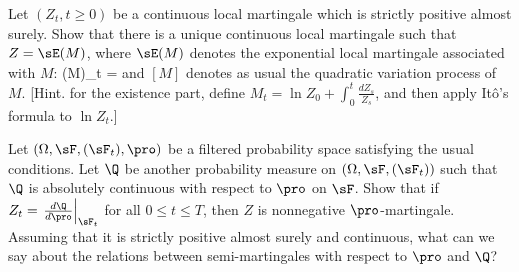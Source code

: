 \item [3.5] 
\ben
\item [(a)] Let $(Z_t, t \geq 0)$ be a continuous local martingale which is strictly positive almost surely. Show that there is a unique continuous local martingale such that $Z = \sE(M)$, where $\sE(M)$ denotes the exponential local martingale associated with $M$:
\be
\E(M)_t = \exp{}
\ee
and $[M]$ denotes as usual the quadratic variation process of $M$. [Hint. for the existence part, define $M_t = \ln Z_0 + \int^t_0 \frac{dZ_s}{Z_s}$, and then apply It\^o's formula to $\ln Z_t$.]

\item [(b)] Let $(\Omega,\sF, (\sF_t), \pro)$ be a filtered probability space satisfying the usual conditions. Let $\Q$ be another probability measure on $(\Omega,\sF, (\sF_t))$ such that $\Q$ is absolutely continuous with respect to $\pro$ on $\sF$. Show that if $Z_t = \left.\frac{d\Q}{d\pro}\right|_{\sF_t}$ for all $0 \leq t \leq T$, then $Z$ is nonnegative $\pro$-martingale. Assuming that it is strictly positive almost surely and continuous, what can we say about the relations between semi-martingales with respect to $\pro$ and $\Q$?
\een

